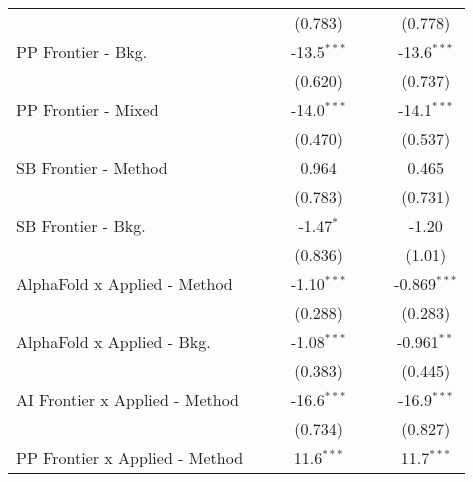 \begin{tabular}{lcccccc}
                                  &                &               & (0.783)       &               &               & (0.778)\\   
   PP Frontier - Bkg.             &                &               & -13.5$^{***}$ &               &               & -13.6$^{***}$\\   
                                  &                &               & (0.620)       &               &               & (0.737)\\   
   PP Frontier - Mixed            &                &               & -14.0$^{***}$ &               &               & -14.1$^{***}$\\   
                                  &                &               & (0.470)       &               &               & (0.537)\\   
   SB Frontier - Method           &                &               & 0.964         &               &               & 0.465\\   
                                  &                &               & (0.783)       &               &               & (0.731)\\   
   SB Frontier - Bkg.             &                &               & -1.47$^{*}$   &               &               & -1.20\\   
                                  &                &               & (0.836)       &               &               & (1.01)\\   
   AlphaFold x Applied - Method   &                &               & -1.10$^{***}$ &               &               & -0.869$^{***}$\\   
                                  &                &               & (0.288)       &               &               & (0.283)\\   
   AlphaFold x Applied - Bkg.     &                &               & -1.08$^{***}$ &               &               & -0.961$^{**}$\\   
                                  &                &               & (0.383)       &               &               & (0.445)\\   
   AI Frontier x Applied - Method &                &               & -16.6$^{***}$ &               &               & -16.9$^{***}$\\   
                                  &                &               & (0.734)       &               &               & (0.827)\\   
   PP Frontier x Applied - Method &                &               & 11.6$^{***}$  &               &               & 11.7$^{***}$\\   

\end{tabular}

